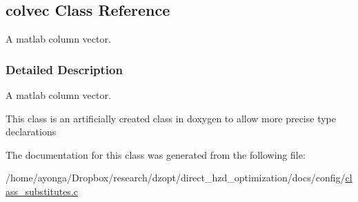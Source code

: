 \hypertarget{classcolvec}{}\subsection{colvec Class Reference}
\label{classcolvec}


A matlab column vector.  




\subsubsection{Detailed Description}
A matlab column vector. 

This class is an artificially created class in doxygen to allow more precise type declarations 

The documentation for this class was generated from the following file\+:\begin{DoxyCompactItemize}
\item 
/home/ayonga/\+Dropbox/research/dzopt/direct\+\_\+hzd\+\_\+optimization/docs/config/\hyperlink{class__substitutes_8c}{class\+\_\+substitutes.\+c}\end{DoxyCompactItemize}
